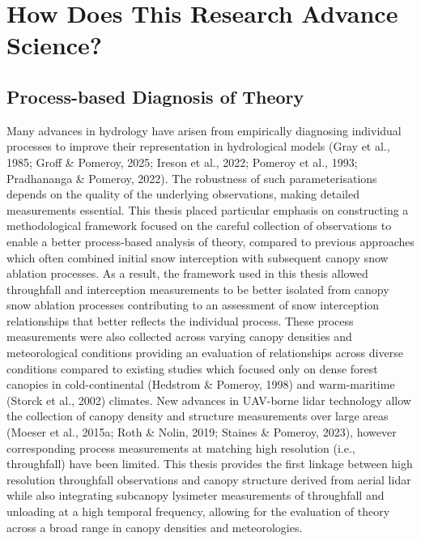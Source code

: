\documentclass[
  letterpaper,
]{tex/uofsthesis-cs}
\begin{document}
\section{How Does This Research Advance
Science?}\label{how-does-this-research-advance-science}

\subsection{Process-based Diagnosis of
Theory}\label{process-based-diagnosis-of-theory}

Many advances in hydrology have arisen from empirically diagnosing
individual processes to improve their representation in hydrological
models (Gray et al., 1985; Groff \& Pomeroy, 2025; Ireson et al., 2022;
Pomeroy et al., 1993; Pradhananga \& Pomeroy, 2022). The robustness of
such parameterisations depends on the quality of the underlying
observations, making detailed measurements essential. This thesis placed
particular emphasis on constructing a methodological framework focused
on the careful collection of observations to enable a better
process-based analysis of theory, compared to previous approaches which
often combined initial snow interception with subsequent canopy snow
ablation processes. As a result, the framework used in this thesis
allowed throughfall and interception measurements to be better isolated
from canopy snow ablation processes contributing to an assessment of
snow interception relationships that better reflects the individual
process. These process measurements were also collected across varying
canopy densities and meteorological conditions providing an evaluation
of relationships across diverse conditions compared to existing studies
which focused only on dense forest canopies in cold-continental
(Hedstrom \& Pomeroy, 1998) and warm-maritime (Storck et al., 2002)
climates. New advances in UAV-borne lidar technology allow the
collection of canopy density and structure measurements over large areas
(Moeser et al., 2015a; Roth \& Nolin, 2019; Staines \& Pomeroy, 2023),
however corresponding process measurements at matching high resolution
(i.e., throughfall) have been limited. This thesis provides the first
linkage between high resolution throughfall observations and canopy
structure derived from aerial lidar while also integrating subcanopy
lysimeter measurements of throughfall and unloading at a high temporal
frequency, allowing for the evaluation of theory across a broad range in
canopy densities and meteorologies.
\end{document}
